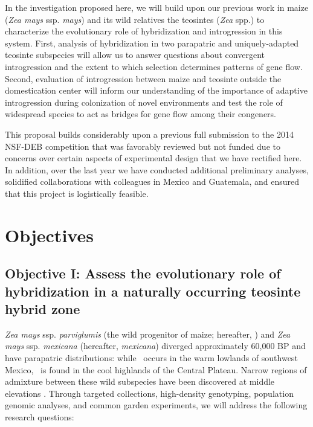 In the investigation proposed here, we will build upon our previous work in maize (\emph{Zea mays} ssp. \emph{mays}) and its wild relatives the teosintes (\emph{Zea} spp.) to characterize the evolutionary role of hybridization and introgression in this system. 
First, analysis of hybridization in two parapatric and uniquely-adapted teosinte subspecies will allow us to answer questions about convergent introgression and the extent to which selection determines patterns of gene flow.
Second, evaluation of introgression between maize and teosinte outside the domestication center will inform our understanding of the importance of adaptive introgression during colonization of novel environments and test the role of widespread species to act as bridges for gene flow among their congeners.

This proposal builds considerably upon a previous full submission to the 2014 NSF-DEB competition that was favorably reviewed but not funded due to concerns over certain aspects of experimental design that we have rectified here.
In addition, over the last year we have conducted additional preliminary analyses, solidified collaborations with colleagues in Mexico and Guatemala, and ensured that this project is logistically feasible.

\section*{Objectives}

\subsection*{Objective I: Assess the evolutionary role of hybridization in a naturally occurring teosinte hybrid zone}
\emph{Zea mays} ssp. \emph{parviglumis} (the wild progenitor of maize; hereafter, \zp) and \emph{Zea mays} ssp. \emph{mexicana} (hereafter, \emph{mexicana}) diverged approximately 60,000 BP \citep{Ross-Ibarra2009a} and have parapatric distributions: while \zp\ occurs in the warm lowlands of southwest Mexico, \zm\  is found in the cool highlands of the Central Plateau. 
Narrow regions of admixture between these wild subspecies have been discovered at middle elevations \citep{Fukunaga2005, Pyhajarvi2013}. 
Through targeted collections, high-density genotyping, population genomic analyses, and common garden experiments, we will address the following research questions: 

